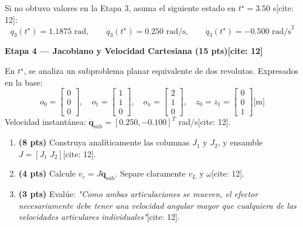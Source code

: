 \documentclass[11pt, a4paper]{article}
\begin{document}
\begin{tcolorbox}[colback=yellow!10, colframe=orange, title=\textbf{Checkpoint de Continuidad B}]
    Si no obtuvo valores en la Etapa 3, asuma el siguiente estado en $t^\star = 3.50$ s[cite: 12]:
    \begin{equation*}
        q_3(t^\star) = 1.1875 \text{ rad}, \qquad \dot{q}_3(t^\star) = 0.250 \text{ rad/s}, \qquad \ddot{q}_3(t^\star) = -0.500 \text{ rad/s}^2
    \end{equation*}
\end{tcolorbox}

\noindent\textbf{\large Etapa 4 — Jacobiano y Velocidad Cartesiana (15 pts)[cite: 12]}

En $t^\star$, se analiza un subproblema planar equivalente de dos revolutas. Expresados en la base:
\begin{equation*}
    o_0 = \begin{bmatrix} 0 \\ 0 \\ 0 \end{bmatrix}, \quad o_1 = \begin{bmatrix} 1 \\ 1 \\ 0 \end{bmatrix}, \quad o_n = \begin{bmatrix} 2 \\ 1 \\ 0 \end{bmatrix}, \quad z_0 = z_1 = \begin{bmatrix} 0 \\ 0 \\ 1 \end{bmatrix} \text{[m]}
\end{equation*}
Velocidad instantánea: $\dot{\mathbf{q}}_{\text{sub}} = [0.250, -0.100]^T$ rad/s[cite: 12].

\begin{enumerate}[label=\textbf{4.\arabic*.}]
    \item \textbf{(8 pts)} Construya analíticamente las columnas $J_1$ y $J_2$, y ensamble $J = [J_1\;J_2]$[cite: 12].
    \item \textbf{(4 pts)} Calcule $v_e = J\dot{\mathbf{q}}_{\text{sub}}$. Separe claramente $v_L$ y $\omega$[cite: 12].
    \item \textbf{(3 pts)} Evalúe: \textit{"Como ambas articulaciones se mueven, el efector necesariamente debe tener una velocidad angular mayor que cualquiera de las velocidades articulares individuales"}[cite: 12].
\end{enumerate}
\end{document}
